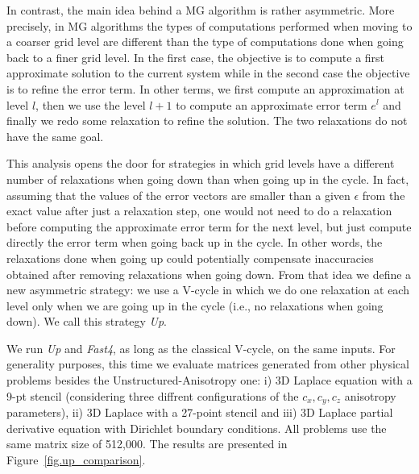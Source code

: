 In contrast, the main idea behind a MG algorithm is rather asymmetric. More
precisely, in MG algorithms the types of computations performed when moving to
a coarser grid level are different than the type of computations done when
going back to a finer grid level. In the first case, the objective is to
compute a first approximate solution to the current system while in the second
case the objective is to refine the error term. In other terms, we first
compute an approximation at level $l$, then we use the level $l+1$ to compute
an approximate error term $e^l$ and finally we redo some relaxation to refine
the solution. The two relaxations do not have the same goal.

This analysis opens the door for strategies in which grid levels have a
different number of relaxations when going down than when going up in the
cycle.  In fact, assuming that the values of the error vectors are smaller
than a given $\epsilon$ from the exact value after just a relaxation step, one
would not need to do a relaxation before computing the approximate error term
for the next level, but just compute directly the error term when going back up
in the cycle. In other words, the relaxations done when going up could
potentially compensate inaccuracies obtained after removing relaxations when
going down. From that idea we define a new asymmetric strategy: we use a
V-cycle in which we do one relaxation at each level only when we are going up
in the cycle (i.e., no relaxations when going down).  We call this strategy
\emph{Up}.

We run \emph{Up} and \emph{Fast4}, as long as the classical V-cycle, on the
same inputs. For generality purposes, this time we 
evaluate matrices generated from other physical problems besides the Unstructured-Anisotropy one: i) 3D Laplace equation with a 9-pt stencil (considering three diffrent configurations of the $c_x,c_y,c_z$ anisotropy parameters), ii) 3D Laplace
with a 27-point stencil and iii) 3D Laplace partial derivative equation with
Dirichlet boundary conditions. All problems use the same matrix size of 512,000. The
results are presented in Figure~\ref{fig.up_comparison}.

